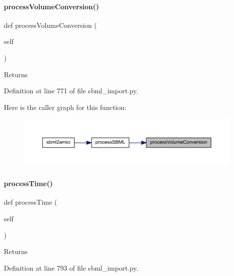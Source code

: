 \paragraph{\texorpdfstring{processVolumeConversion()}{processVolumeConversion()}}
{\footnotesize\ttfamily def process\+Volume\+Conversion (\begin{DoxyParamCaption}\item[{}]{self }\end{DoxyParamCaption})}

\begin{DoxyReturn}{Returns}

\end{DoxyReturn}


Definition at line 771 of file sbml\+\_\+import.\+py.

Here is the caller graph for this function\+:
\nopagebreak
\begin{figure}[H]
\begin{center}
\leavevmode
\includegraphics[width=350pt]{classamici_1_1sbml__import_1_1_sbml_importer_af2a2cbf8550d30fc0e95a875758b8262_icgraph}
\end{center}
\end{figure}
\mbox{\label{classamici_1_1sbml__import_1_1_sbml_importer_a2819c6ad1b541e49e728aa172e57208e}} 
\paragraph{\texorpdfstring{processTime()}{processTime()}}
{\footnotesize\ttfamily def process\+Time (\begin{DoxyParamCaption}\item[{}]{self }\end{DoxyParamCaption})}

\begin{DoxyReturn}{Returns}

\end{DoxyReturn}


Definition at line 793 of file sbml\+\_\+import.\+py.

